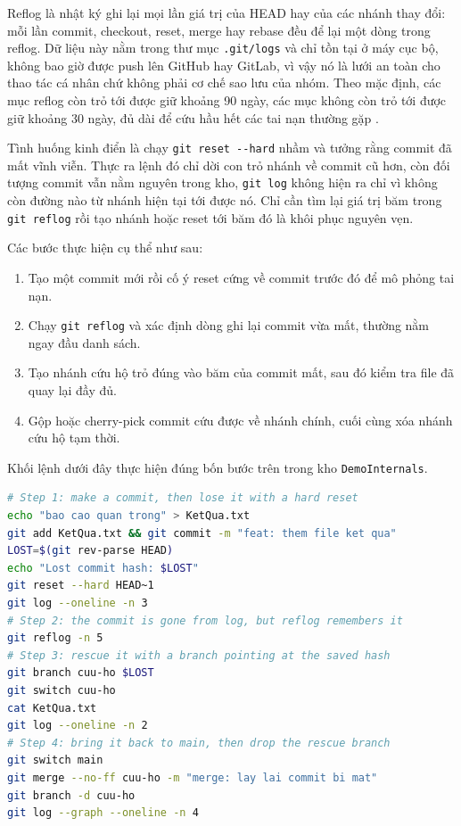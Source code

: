 Reflog là nhật ký ghi lại mọi lần giá trị của HEAD hay của các nhánh thay đổi: mỗi lần commit, checkout, reset, merge hay rebase đều để lại một dòng trong reflog.
Dữ liệu này nằm trong thư mục \verb|.git/logs| và chỉ tồn tại ở máy cục bộ, không bao giờ được push lên GitHub hay GitLab, vì vậy nó là lưới an toàn cho thao tác cá nhân chứ không phải cơ chế sao lưu của nhóm.
Theo mặc định, các mục reflog còn trỏ tới được giữ khoảng 90 ngày, các mục không còn trỏ tới được giữ khoảng 30 ngày, đủ dài để cứu hầu hết các tai nạn thường gặp \cite{atlassiangit}.

Tình huống kinh điển là chạy \verb|git reset --hard| nhầm và tưởng rằng commit đã mất vĩnh viễn.
Thực ra lệnh đó chỉ dời con trỏ nhánh về commit cũ hơn, còn đối tượng commit vẫn nằm nguyên trong kho, \verb|git log| không hiện ra chỉ vì không còn đường nào từ nhánh hiện tại tới được nó.
Chỉ cần tìm lại giá trị băm trong \verb|git reflog| rồi tạo nhánh hoặc reset tới băm đó là khôi phục nguyên vẹn.

Các bước thực hiện cụ thể như sau:

\begin{enumerate}
\item Tạo một commit mới rồi cố ý reset cứng về commit trước đó để mô phỏng tai nạn.
\item Chạy \verb|git reflog| và xác định dòng ghi lại commit vừa mất, thường nằm ngay đầu danh sách.
\item Tạo nhánh cứu hộ trỏ đúng vào băm của commit mất, sau đó kiểm tra file đã quay lại đầy đủ.
\item Gộp hoặc cherry-pick commit cứu được về nhánh chính, cuối cùng xóa nhánh cứu hộ tạm thời.
\end{enumerate}

Khối lệnh dưới đây thực hiện đúng bốn bước trên trong kho \verb|DemoInternals|.

\begin{lstlisting}[language=bash]
# Step 1: make a commit, then lose it with a hard reset
echo "bao cao quan trong" > KetQua.txt
git add KetQua.txt && git commit -m "feat: them file ket qua"
LOST=$(git rev-parse HEAD)
echo "Lost commit hash: $LOST"
git reset --hard HEAD~1
git log --oneline -n 3
# Step 2: the commit is gone from log, but reflog remembers it
git reflog -n 5
# Step 3: rescue it with a branch pointing at the saved hash
git branch cuu-ho $LOST
git switch cuu-ho
cat KetQua.txt
git log --oneline -n 2
# Step 4: bring it back to main, then drop the rescue branch
git switch main
git merge --no-ff cuu-ho -m "merge: lay lai commit bi mat"
git branch -d cuu-ho
git log --graph --oneline -n 4
\end{lstlisting}

